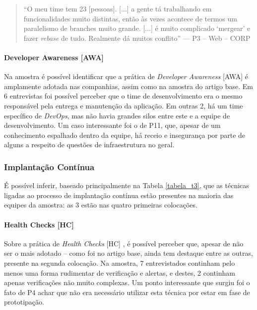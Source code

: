 \begin{quote}
    ``O meu time tem 23 [pessoas]. [...] a gente tá trabalhando em funcionalidades muito distintas, então às vezes acontece de termos um paralelismo de branches muito grande. [...] é muito complicado `mergear' e fazer \emph{rebase} de tudo. Realmente dá muitos conflito'' --- P3 -- Web -- CORP
\end{quote}


\paragraph{Developer Awareness [AWA]}

Na amostra é possível identificar que a prática de \emph{Developer Awareness} [AWA] é amplamente adotada nas companhias, assim como na amostra do artigo base. Em 6 entrevistas foi possível perceber que o time de desenvolvimento era o mesmo responsável pela entrega e manutenção da aplicação. Em outras 2, há um time específico de \emph{DevOps}, mas não havia grandes silos entre este e a equipe de desenvolvimento. Um caso interessante foi o de P11, que, apesar de um conhecimento espalhado dentro da equipe, há receio e insegurança por parte de alguns a respeito de questões de infraestrutura no geral.


\subsubsection{Implantação Contínua}

É possível inferir, baseado principalmente na Tabela \ref{tabela_t3}, que as técnicas ligadas ao processo de implantação contínua estão presentes na maioria das equipes da amostra: as 3 estão nas quatro primeiras colocações. 

\paragraph{Health Checks [HC]}

Sobre a prática de \emph{Health Checks} [HC] \cite{devopsBook}, é possível perceber que, apesar de não ser o mais adotado -- como foi no artigo base, ainda tem destaque entre as outras, presente na segunda colocação. Na amostra, 7 entrevistados continham pelo menos uma forma rudimentar de verificação e alertas, e destes, 2 continham apenas verificações não muito complexas. Um ponto interessante que surgiu foi o fato de P4 achar que não era necessário utilizar esta técnica por estar em fase de prototipação.

